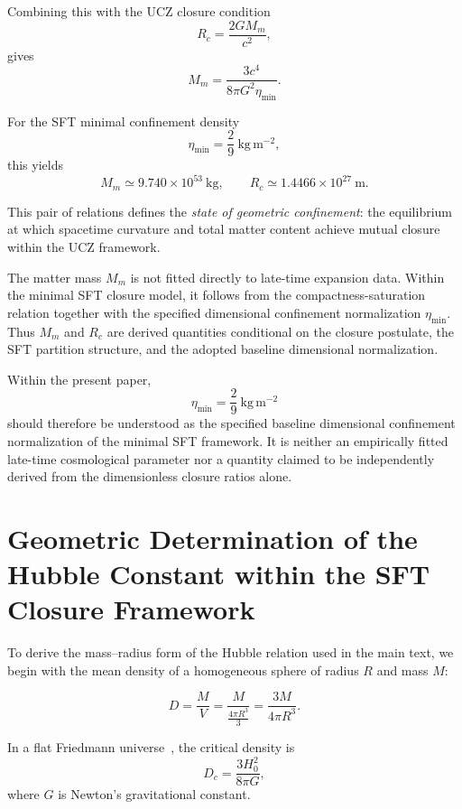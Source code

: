 \documentclass[12pt]{article}
\begin{document}
Combining this with the UCZ closure condition
\[
R_c=\frac{2GM_m}{c^2},
\]
gives
\begin{equation}
\boxed{
M_m
=
\frac{3c^4}{8\pi G^2\eta_{\min}}.
}
\label{eq:M_total_eta_min}
\end{equation}

For the SFT minimal confinement density
\[
\eta_{\min}=\frac{2}{9}\ \mathrm{kg\,m^{-2}},
\]
this yields
\[
M_m\simeq9.740\times10^{53}\ \mathrm{kg},
\qquad
R_c\simeq1.4466\times10^{27}\ \mathrm{m}.
\]

This pair of relations defines the \emph{state of geometric confinement}:
the equilibrium at which spacetime curvature and total matter content
achieve mutual closure within the UCZ framework.


The matter mass \(M_m\) is not fitted directly to late-time expansion
data. Within the minimal SFT closure model, it follows from the
compactness-saturation relation together with the specified dimensional
confinement normalization \(\eta_{\min}\). Thus \(M_m\) and \(R_c\) are
derived quantities conditional on the closure postulate, the SFT
partition structure, and the adopted baseline dimensional
normalization.

Within the present paper,
\[
\eta_{\min}
=
\frac{2}{9}\ \mathrm{kg\,m^{-2}}
\]
should therefore be understood as the specified baseline dimensional
confinement normalization of the minimal SFT framework. It is neither
an empirically fitted late-time cosmological parameter nor a quantity
claimed to be independently derived from the dimensionless closure
ratios alone.


\section{Geometric Determination of the Hubble Constant within the SFT Closure Framework}
\label{app:Hubble_tension_solution}

To derive the mass--radius form of the Hubble relation used in the
main text, we begin with the mean density of a homogeneous sphere of
radius $R$ and mass $M$:

\begin{equation}
D = \frac{M}{V} = \frac{M}{\frac{4\pi R^3}{3}}
=
\frac{3M}{4\pi R^3}.
\label{eq:mean_density_app}
\end{equation}


In a flat Friedmann universe~\cite{schutz2003gravity}, the critical density is
\begin{equation}
D_c = \frac{3H_0^2}{8\pi G},
\label{eq:critical_density_app}
\end{equation}
where $G$ is Newton’s gravitational constant.  
\end{document}
